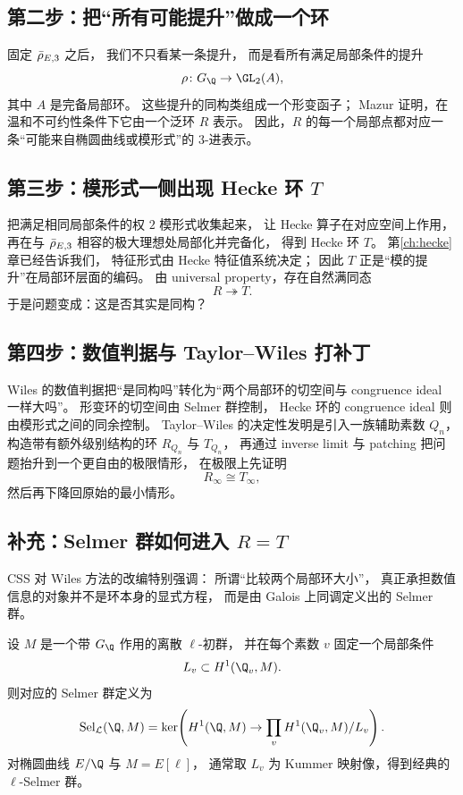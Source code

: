 \subsection*{第二步：把“所有可能提升”做成一个环}
固定 $\bar{\rho}_{E,3}$ 之后，
我们不只看某一条提升，
而是看所有满足局部条件的提升
\[
  \rho\colon G_\Q\to \GL_2(A),
\]
其中 $A$ 是完备局部环。
这些提升的同构类组成一个形变函子；
Mazur 证明，在温和不可约性条件下它由一个泛环 $R$ 表示。
因此，$R$ 的每一个局部点都对应一条“可能来自椭圆曲线或模形式”的 $3$-进表示。

\subsection*{第三步：模形式一侧出现 Hecke 环 $T$}
把满足相同局部条件的权 $2$ 模形式收集起来，
让 Hecke 算子在对应空间上作用，
再在与 $\bar{\rho}_{E,3}$ 相容的极大理想处局部化并完备化，
得到 Hecke 环 $T$。
第\ref{ch:hecke}章已经告诉我们，
特征形式由 Hecke 特征值系统决定；
因此 $T$ 正是“模的提升”在局部环层面的编码。
由 universal property，存在自然满同态
\[
  R\twoheadrightarrow T.
\]
于是问题变成：这是否其实是同构？

\subsection*{第四步：数值判据与 Taylor--Wiles 打补丁}
Wiles 的数值判据把“是同构吗”转化为“两个局部环的切空间与 congruence ideal 一样大吗”。
形变环的切空间由 Selmer 群控制，
Hecke 环的 congruence ideal 则由模形式之间的同余控制。
Taylor--Wiles 的决定性发明是引入一族辅助素数 $Q_n$，
构造带有额外级别结构的环 $R_{Q_n}$ 与 $T_{Q_n}$，
再通过 inverse limit 与 patching 把问题抬升到一个更自由的极限情形，
在极限上先证明
\[
  R_\infty\cong T_\infty,
\]
然后再下降回原始的最小情形。

\subsection*{补充：Selmer 群如何进入 $R=T$}
CSS 对 Wiles 方法的改编特别强调：
所谓“比较两个局部环大小”，
真正承担数值信息的对象并不是环本身的显式方程，
而是由 Galois 上同调定义出的 Selmer 群。

\begin{definition}
设 $M$ 是一个带 $G_\Q$ 作用的离散 $\ell$-初群，
并在每个素数 $v$ 固定一个局部条件
\[
  L_v\subset H^1(\Q_v,M).
\]
则对应的 Selmer 群定义为
\[
  \Sel_{\mathcal L}(\Q,M)
  =\ker\!\left(H^1(\Q,M)\to \prod_v H^1(\Q_v,M)/L_v\right).
\]
对椭圆曲线 $E/\Q$ 与 $M=E[\ell]$，
通常取 $L_v$ 为 Kummer 映射像，得到经典的 $\ell$-Selmer 群。
\end{definition}

